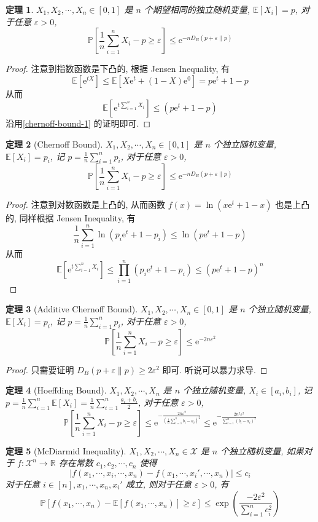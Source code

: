 \documentclass[8pt]{article}
\theoremstyle{compact}
\newtheorem{theorem}{定理}[section]
\def\le{\leqslant}
\def\ge{\geqslant}
\def\P#1{\mathbb{P}\left[{#1}\right]}
\def\E#1{\mathbb{E}\left[{#1}\right]}
\def\e{\mathrm{e}}
\begin{document}
\begin{theorem}
	$X_1, X_2, \cdots, X_n \in [0, 1]$ 是 $n$ 个期望相同的独立随机变量, $\E{X_i} = p$, 对于任意 $\varepsilon > 0$, $$\P{\frac1n\sum_{i=1}^nX_i - p \ge \varepsilon} \le \e^{-nD_B(p + \varepsilon \| p)}$$
	\label{chernoff-bound-2}
\end{theorem}
\begin{proof}
	注意到指数函数是下凸的, 根据 Jensen Inequality, 有 $$\E{\e^{tX}} \le \E{X\e^t + (1 - X)\e^0} = p\e^t + 1 - p$$ 从而 $$\E{\e^{t\sum_{i=1}^{n}X_i}} \le (p\e^t + 1 - p)$$ 沿用\cref{chernoff-bound-1} 的证明即可.
\end{proof}
\begin{theorem}[Chernoff Bound]
	$X_1, X_2, \cdots, X_n \in [0, 1]$ 是 $n$ 个独立随机变量, $\E{X_i} = p_i$, 记 $p = \frac{1}{n} \sum_{i=1}^{n}p_i$, 对于任意 $\varepsilon > 0$, $$\P{\frac1n\sum_{i=1}^nX_i - p \ge \varepsilon} \le \e^{-nD_B(p + \varepsilon \| p)}$$
	\label{chernoff-bound-3}
\end{theorem}
\begin{proof}
	注意到对数函数是上凸的, 从而函数 $f(x) = \ln(x\e^t + 1 - x)$ 也是上凸的, 同样根据 Jensen Inequality, 有 $$\frac1n \sum_{i=1}^{n}\ln(p_i\e^t + 1 - p_i) \le \ln(p\e^t + 1 - p)$$
	从而 $$\E{\e^{t\sum_{i=1}^{n}X_i}} \le \prod_{i=1}^{n}(p_i\e^t + 1 - p_i) \le (p\e^t + 1 - p)^n$$
\end{proof}
\begin{theorem}[Additive Chernoff Bound]
	$X_1, X_2, \cdots, X_n \in [0, 1]$ 是 $n$ 个独立随机变量, $\E{X_i} = p_i$, 记 $p = \frac{1}{n} \sum_{i=1}^{n}p_i$, 对于任意 $\varepsilon > 0$, $$\P{\frac1n\sum_{i=1}^nX_i - p \ge \varepsilon} \le \e^{-2n\varepsilon^2}$$
	\label{chernoff-bound-additive}
\end{theorem}
\begin{proof}
	只需要证明 $D_B(p + \varepsilon \| p) \ge 2\varepsilon^2$ 即可. 听说可以暴力求导.
\end{proof}
\begin{theorem}[Hoeffding Bound]
	$X_1, X_2, \cdots, X_n$ 是 $n$ 个独立随机变量, $X_i \in [a_i, b_i]$, 记 $p = \frac{1}{n} \sum_{i=1}^{n}\E{X_i} = \frac1n \sum_{i=1}^{n}\frac{a_i + b_i}{2}$, 对于任意 $\varepsilon > 0$, $$\P{\frac1n\sum_{i=1}^nX_i - p \ge \varepsilon} \le \e^{-\frac{2n\varepsilon^2}{\left(\frac1n\sum_{i=1}^{n}b_i-a_i\right)^2}} \le \e^{-\frac{2n^2\varepsilon^2}{\sum_{i=1}^{n}(b_i-a_i)^2}}$$
	\label{hoeffding-bound}
\end{theorem}
\begin{theorem}[McDiarmid Inequality]
	$X_1, X_2, \cdots, X_n \in \mathcal X$ 是 $n$ 个独立随机变量, 如果对于 $f: \mathcal X^n \to \mathbb R$ 存在常数 $c_1, c_2, \cdots, c_n$ 使得 $$|f(x_1, \cdots, x_i, \cdots, x_n) - f(x_1, \cdots, x_i', \cdots, x_n)| \le c_i$$对于任意 $i \in [n], x_1, \cdots, x_n, x_i'$ 成立, 则对于任意 $\varepsilon > 0$, 有 $$\P{f(x_1, \cdots, x_n) - \E{f(x_1, \cdots, x_n)} \ge \varepsilon} \le \exp\left(\frac{-2\varepsilon^2}{\sum_{i=1}^{n}c_i^2}\right)$$
	\label{mcdiarmid-inequ}
\end{theorem}
\end{document}
